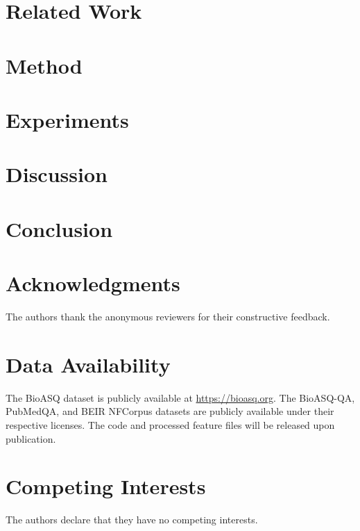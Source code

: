 \documentclass[11pt]{article}
\begin{document}
\section{Related Work}

\section{Method}
\label{sec:method}


\section{Experiments}




\section{Discussion}
\label{sec:discussion}

\section{Conclusion}


\section*{Acknowledgments}
The authors thank the anonymous reviewers for their constructive feedback.

\section*{Data Availability}
The BioASQ dataset is publicly available at \url{https://bioasq.org}. The BioASQ-QA, PubMedQA, and BEIR NFCorpus datasets are publicly available under their respective licenses. The code and processed feature files will be released upon publication.

\section*{Competing Interests}
The authors declare that they have no competing interests.

\appendix




\end{document}
